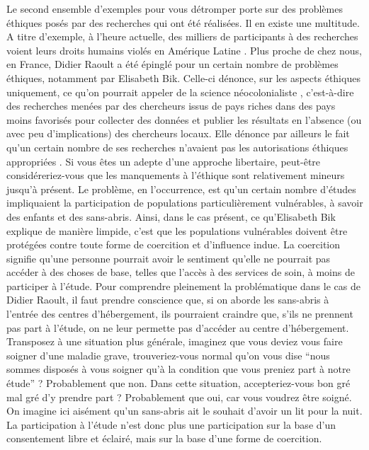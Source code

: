 \documentclass[
  12pt,
]{book}
\begin{document}
Le second ensemble d'exemples pour vous détromper porte sur des problèmes éthiques posés par des recherches qui ont été réalisées. Il en existe une multitude. A titre d'exemple, à l'heure actuelle, des milliers de participants à des recherches voient leurs droits humains violés en Amérique Latine \citep{Homedes2014}. Plus proche de chez nous, en France, Didier Raoult a été épinglé pour un certain nombre de problèmes éthiques, notamment par Elisabeth Bik. Celle-ci dénonce, sur les aspects éthiques uniquement, ce qu'on pourrait appeler de la science néocolonialiste \citep{Bik1}, c'est-à-dire des recherches menées par des chercheurs issus de pays riches dans des pays moins favorisés pour collecter des données et publier les résultats en l'absence (ou avec peu d'implications) des chercheurs locaux. Elle dénonce par ailleurs le fait qu'un certain nombre de ses recherches n'avaient pas les autorisations éthiques appropriées \citep{Bik2}. Si vous êtes un adepte d'une approche libertaire, peut-être considéreriez-vous que les manquements à l'éthique sont relativement mineurs jusqu'à présent.
Le problème, en l'occurrence, est qu'un certain nombre d'études impliquaient la participation de populations particulièrement vulnérables, à savoir des enfants et des sans-abris. Ainsi, dans le cas présent, ce qu'Elisabeth Bik explique de manière limpide, c'est que les populations vulnérables doivent être protégées contre toute forme de coercition et d'influence indue. La coercition signifie qu'une personne pourrait avoir le sentiment qu'elle ne pourrait pas accéder à des choses de base, telles que l'accès à des services de soin, à moins de participer à l'étude. Pour comprendre pleinement la problématique dans le cas de Didier Raoult, il faut prendre conscience que, si on aborde les sans-abris à l'entrée des centres d'hébergement, ils pourraient craindre que, s'ils ne prennent pas part à l'étude, on ne leur permette pas d'accéder au centre d'hébergement. Transposez à une situation plus générale, imaginez que vous deviez vous faire soigner d'une maladie grave, trouveriez-vous normal qu'on vous dise ``nous sommes disposés à vous soigner qu'à la condition que vous preniez part à notre étude'' ? Probablement que non. Dans cette situation, accepteriez-vous bon gré mal gré d'y prendre part ? Probablement que oui, car vous voudrez être soigné. On imagine ici aisément qu'un sans-abris ait le souhait d'avoir un lit pour la nuit. La participation à l'étude n'est donc plus une participation sur la base d'un consentement libre et éclairé, mais sur la base d'une forme de coercition.
\end{document}
